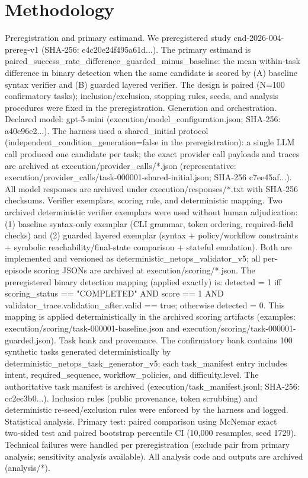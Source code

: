 \documentclass[conference]{IEEEtran}
\begin{document}
\section{Methodology}
Preregistration and primary estimand. We preregistered study cnd-2026-004-prereg-v1 (SHA‑256: e4c20e24f495a61d...). The primary estimand is paired\_success\_rate\_difference\_guarded\_minus\_baseline: the mean within‑task difference in binary detection when the same candidate is scored by (A) baseline syntax verifier and (B) guarded layered verifier. The design is paired (N=100 confirmatory tasks); inclusion/exclusion, stopping rules, seeds, and analysis procedures were fixed in the preregistration.
Generation and orchestration. Declared model: gpt-5-mini (execution/model\_configuration.json; SHA‑256: a40e96e2...). The harness used a shared\_initial protocol (independent\_condition\_generation=false in the preregistration): a single LLM call produced one candidate per task; the exact provider call payloads and traces are archived at execution/provider\_calls/*.json (representative: execution/provider\_calls/task-000001-shared-initial.json; SHA‑256 c7ee45af...). All model responses are archived under execution/responses/*.txt with SHA‑256 checksums.
Verifier exemplars, scoring rule, and deterministic mapping. Two archived deterministic verifier exemplars were used without human adjudication: (1) baseline syntax-only exemplar (CLI grammar, token ordering, required-field checks) and (2) guarded layered exemplar (syntax + policy/workflow constraints + symbolic reachability/final-state comparison + stateful emulation). Both are implemented and versioned as deterministic\_netops\_validator\_v5; all per-episode scoring JSONs are archived at execution/scoring/*.json. The preregistered binary detection mapping (applied exactly) is: detected = 1 iff scoring\_status == "COMPLETED" AND score == 1 AND validator\_trace.validation\_after.valid == true; otherwise detected = 0. This mapping is applied deterministically in the archived scoring artifacts (examples: execution/scoring/task-000001-baseline.json and execution/scoring/task-000001-guarded.json).
Task bank and provenance. The confirmatory bank contains 100 synthetic tasks generated deterministically by deterministic\_netops\_task\_generator\_v5; each task\_manifest entry includes intent, required\_sequence, workflow\_policies, and difficulty.level. The authoritative task manifest is archived (execution/task\_manifest.jsonl; SHA‑256: cc2ec3b0...). Inclusion rules (public provenance, token scrubbing) and deterministic re-seed/exclusion rules were enforced by the harness and logged.
Statistical analysis. Primary test: paired comparison using McNemar exact two‑sided test and paired bootstrap percentile CI (10,000 resamples, seed 1729). Technical failures were handled per preregistration (exclude pair from primary analysis; sensitivity analysis available). All analysis code and outputs are archived (analysis/*).
\end{document}
